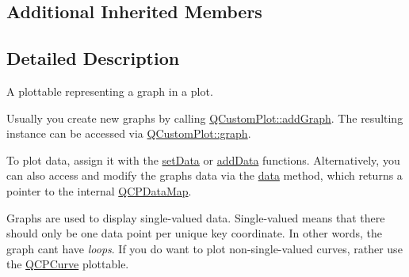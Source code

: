 \subsection*{Additional Inherited Members}


\subsection{Detailed Description}
A plottable representing a graph in a plot. 



Usually you create new graphs by calling \hyperlink{class_q_custom_plot_a6fb2873d35a8a8089842d81a70a54167}{Q\+Custom\+Plot\+::add\+Graph}. The resulting instance can be accessed via \hyperlink{class_q_custom_plot_a6ecae130f684b25276fb47bd3a5875c6}{Q\+Custom\+Plot\+::graph}.

To plot data, assign it with the \hyperlink{class_q_c_p_graph_a1df2fd710545c8ba3b2c99a39a27bf8b}{set\+Data} or \hyperlink{class_q_c_p_graph_aa5c6181d84db72ce4dbe9dc15a34ef4f}{add\+Data} functions. Alternatively, you can also access and modify the graph\textquotesingle{}s data via the \hyperlink{class_q_c_p_graph_acde1c0d1f6a817930489548396e6b3e6}{data} method, which returns a pointer to the internal \hyperlink{qcustomplot_8h_a84a9c4a4c2216ccfdcb5f3067cda76e3}{Q\+C\+P\+Data\+Map}.

Graphs are used to display single-\/valued data. Single-\/valued means that there should only be one data point per unique key coordinate. In other words, the graph can\textquotesingle{}t have {\itshape loops}. If you do want to plot non-\/single-\/valued curves, rather use the \hyperlink{class_q_c_p_curve}{Q\+C\+P\+Curve} plottable.

